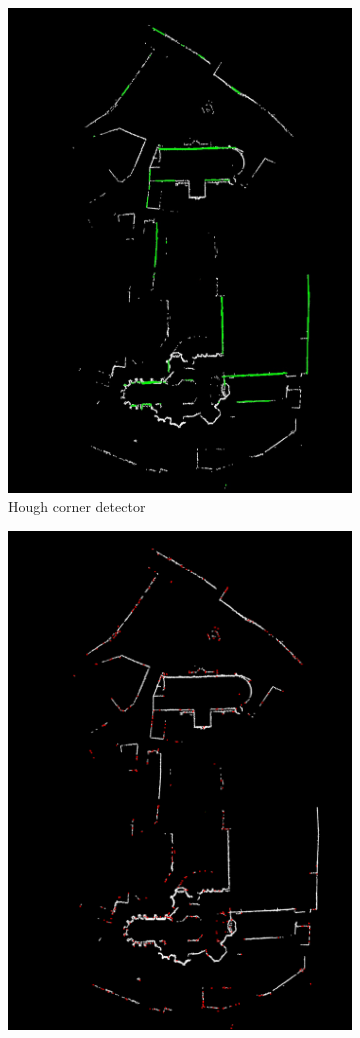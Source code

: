 \documentclass[10pt,twocolumn,letterpaper]{article}
\begin{document}
\begin{figure}
\begin{subfigure}{.5\linewidth}
  \centering
  \includegraphics[width=.8\linewidth]{images/houghlines6.jpg}
  \caption{Hough corner detector}
  \label{fig:hough}
\end{subfigure}%
\begin{subfigure}{.5\linewidth}
  \centering
  \includegraphics[width=.8\linewidth]{images/harris.png}

\end{subfigure}
\end{figure}
\end{document}
